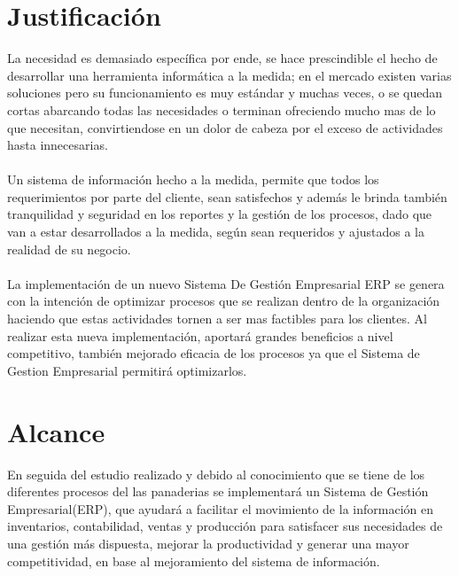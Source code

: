 \section{Justificaci\'on}
La necesidad es demasiado espec\'ifica por ende, se hace prescindible el hecho de desarrollar una herramienta inform\'atica a la medida; en el mercado existen varias soluciones pero su funcionamiento es muy est\'andar y muchas veces, o se quedan cortas abarcando todas las necesidades o terminan ofreciendo mucho mas de lo que necesitan, convirtiendose en un dolor de cabeza por el exceso de actividades hasta innecesarias.%
\\%
\\%
Un sistema de informaci\'on hecho a la medida, permite que todos los requerimientos por parte del cliente, sean satisfechos y adem\'as le brinda tambi\'en tranquilidad y seguridad en los reportes y la gesti\'on de los procesos, dado que van a estar desarrollados a la medida, seg\'un sean requeridos y ajustados a la realidad de su negocio.%
\\%
\\%
La implementaci\'on de un nuevo Sistema De Gesti\'on Empresarial ERP se genera con la intenci\'on de optimizar procesos que se realizan dentro de la organizaci\'on haciendo que estas actividades tornen a ser mas factibles para los clientes. Al realizar esta nueva implementaci\'on, aportar\'a grandes beneficios a nivel competitivo, tambi\'en mejorado eficacia de los procesos ya que el Sistema de Gestion Empresarial permitir\'a optimizarlos.
%
\section{Alcance}
En seguida del estudio realizado y debido al conocimiento que se tiene de los diferentes procesos del las panaderias se implementar\'a un Sistema de Gesti\'on Empresarial(ERP), que ayudar\'a a facilitar el movimiento de la informaci\'on en inventarios, contabilidad, ventas y producci\'on para satisfacer sus necesidades de una gesti\'on m\'as dispuesta, mejorar la productividad y generar una mayor competitividad, en base al mejoramiento del sistema de informaci\'on.%